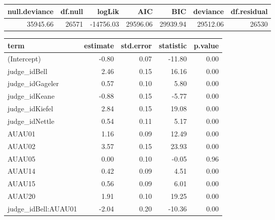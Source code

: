 \documentclass{monashthesis}
\begin{document}
\begin{tabular}{r|r|r|r|r|r|r}
\hline
null.deviance & df.null & logLik & AIC & BIC & deviance & df.residual\\
\hline
35945.66 & 26571 & -14756.03 & 29596.06 & 29939.94 & 29512.06 & 26530\\
\hline
\end{tabular}

\begin{tabular}{l|r|r|r|r}
\hline
term & estimate & std.error & statistic & p.value\\
\hline
(Intercept) & -0.80 & 0.07 & -11.80 & 0.00\\
\hline
judge\_idBell & 2.46 & 0.15 & 16.16 & 0.00\\
\hline
judge\_idGageler & 0.57 & 0.10 & 5.80 & 0.00\\
\hline
judge\_idKeane & -0.88 & 0.15 & -5.77 & 0.00\\
\hline
judge\_idKiefel & 2.84 & 0.15 & 19.08 & 0.00\\
\hline
judge\_idNettle & 0.54 & 0.11 & 5.17 & 0.00\\
\hline
AUAU01 & 1.16 & 0.09 & 12.49 & 0.00\\
\hline
AUAU02 & 3.57 & 0.15 & 23.93 & 0.00\\
\hline
AUAU05 & 0.00 & 0.10 & -0.05 & 0.96\\
\hline
AUAU14 & 0.42 & 0.09 & 4.51 & 0.00\\
\hline
AUAU15 & 0.56 & 0.09 & 6.01 & 0.00\\
\hline
AUAU20 & 1.91 & 0.10 & 19.25 & 0.00\\
\hline
judge\_idBell:AUAU01 & -2.04 & 0.20 & -10.36 & 0.00\\
\hline
\end{tabular}
\end{document}
